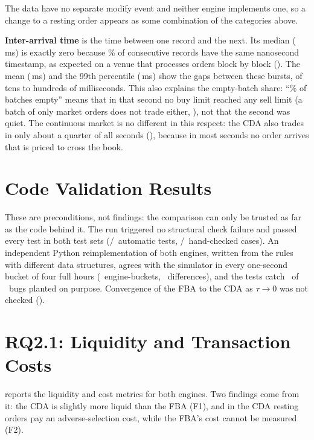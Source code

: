The data have no separate modify event and neither engine implements one, so
a change to a resting order appears as some combination of the categories
above.

\textbf{Inter-arrival time} is the time between one record and the next. Its
median (\SampleMedianInterArrival\,ms) is exactly zero because
\SampleZeroGapPct\% of consecutive records have the same nanosecond timestamp,
as expected on a venue that processes orders block by block
(). The mean (\SampleMeanInterArrival\,ms) and the 99th
percentile (\SamplePNinetyNineInterArrival\,ms) show the gaps between these
bursts, of tens to hundreds of milliseconds. This also explains the
empty-batch share: ``\FbaEmptyBatchShare\% of batches empty'' means that in
that second no buy limit reached any sell limit (a batch of only market
orders does not trade either, ), not that the second
was quiet. The continuous market is no different in this respect: the CDA
also trades in only about a quarter of all seconds (),
because in most seconds no order arrives that is priced to cross the book.

\section{Code Validation Results}
\label{sec:validationresults}

These are preconditions, not findings: the comparison can only be trusted as
far as the code behind it. The run triggered no structural check failure and
passed every test in both test sets (\VerTestsPassed/\VerTestsTotal\
automatic tests, \ValChecklistPassed/\ValChecklistTotal\ hand-checked cases).
An independent Python reimplementation of both engines, written from the
rules with different data structures, agrees with the simulator in every
one-second bucket of four full hours (\VerRefBuckets\ engine-buckets,
\VerRefMismatches\ differences), and the tests catch \VerMutKilled\ of
\VerMutTotal\ bugs planted on purpose. Convergence of the FBA to
the CDA as $\tau \to 0$ was not checked (\Cref{sec:limitsreplay}).

\section{RQ2.1: Liquidity and Transaction Costs}
\label{sec:res21}

 reports the liquidity and cost metrics for both engines.
Two findings come from it: the CDA is slightly more liquid than the FBA
(F1), and in the CDA resting orders pay an adverse-selection cost, while
the FBA's cost cannot be measured (F2).

